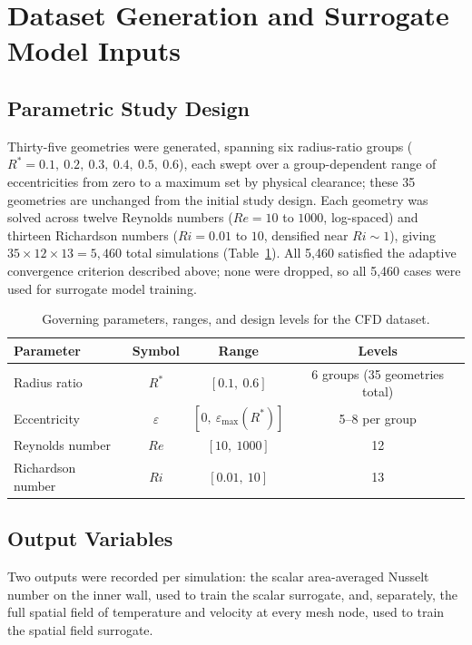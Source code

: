 \section{Dataset Generation and Surrogate Model Inputs}
\label{sec:dataset}

\subsection{Parametric Study Design}
\label{subsec:params}

Thirty-five geometries were generated, spanning six radius-ratio groups ($R^\ast = 0.1,\allowbreak\ 0.2,\ 0.3,\ 0.4,\ 0.5,\ 0.6$), each swept over a group-dependent range of eccentricities from zero to a maximum set by physical clearance; these 35 geometries are unchanged from the initial study design. Each geometry was solved across twelve Reynolds numbers ($Re = 10$ to $1000$, log-spaced) and thirteen Richardson numbers ($Ri = 0.01$ to $10$, densified near $Ri\sim1$), giving $35 \times 12 \times 13 = 5{,}460$ total simulations (Table~\ref{tab:params}). All 5,460 satisfied the adaptive convergence criterion described above; none were dropped, so all 5,460 cases were used for surrogate model training.

\begin{table}[h]
\centering
\caption{Governing parameters, ranges, and design levels for the CFD dataset.}
\label{tab:params}
\begin{tabular}{lccc}
\toprule
Parameter & Symbol & Range & Levels \\
\midrule
Radius ratio      & $R^\ast$   & $[0.1,\ 0.6]$   & 6 groups (35 geometries total) \\
Eccentricity      & $\varepsilon$ & $[0,\ \varepsilon_{\max}(R^\ast)]$ & 5--8 per group \\
Reynolds number   & $Re$       & $[10,\ 1000]$   & 12 \\
Richardson number & $Ri$       & $[0.01,\ 10]$   & 13 \\
\bottomrule
\end{tabular}
\end{table}

\subsection{Output Variables}
\label{subsec:output}

Two outputs were recorded per simulation: the scalar area-averaged Nusselt number on the inner wall, used to train the scalar surrogate, and, separately, the full spatial field of temperature and velocity at every mesh node, used to train the spatial field surrogate.
